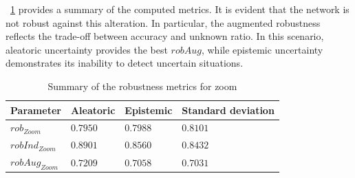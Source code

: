 \Tab~\ref{table:rob_zo} provides a summary of the computed metrics. It is evident that the network is not robust against this alteration. In particular, the augmented robustness reflects the trade-off between accuracy and unknown ratio. In this scenario, aleatoric uncertainty provides the best $robAug$, while epistemic uncertainty demonstrates its inability to detect uncertain situations.

\begin{table}[h]
	\centering
	\begin{tabular}{|| l | l | l | l ||} 
		\hline
		\textbf{Parameter} & \textbf{Aleatoric} & \textbf{Epistemic} & \textbf{Standard deviation} \\
		\hline
		\hline
		$rob_{Zoom}$ & $0.7950$ & $0.7988$ & $0.8101$ \\
		$robInd_{Zoom}$ & $0.8901$ & $0.8560$ & $0.8432$ \\
		$robAug_{Zoom}$ & $0.7209$ & $0.7058$ & $0.7031$ \\	
		\hline
	\end{tabular}	
	\caption{Summary of the robustness metrics for zoom}
	\label{table:rob_zo}
\end{table}